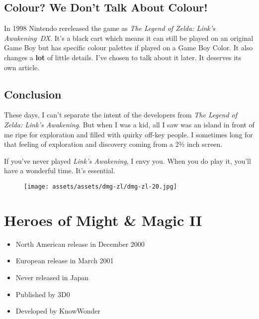\documentclass{book}
\begin{document}
\FloatBarrier\needspace{5pt}\section*{Colour? We Don’t Talk About Colour!}\nopagebreak[4]

In 1998 Nintendo rereleased the game as \emph{The Legend of Zelda: Link’s Awakening DX}. It’s a black cart which means it can still be played on an original Game Boy but has specific colour palettes if played on a Game Boy Color. It also changes a \textbf{lot} of little details. I’ve chosen to talk about it later. It deserves its own article.

\FloatBarrier\needspace{5pt}\section*{Conclusion}\nopagebreak[4]

These days, I can’t separate the intent of the developers from \emph{The Legend of Zelda: Link’s Awakening}. But when I was a kid, all I saw was an island in front of me ripe for exploration and filled with quirky off-key people. I sometimes long for that feeling of exploration and discovery coming from a 2½ inch screen.

If you’ve never played \emph{Link’s Awakening}, I envy you. When you do play it, you’ll have a wonderful time. It’s essential.

\begin{figure}[hbt]
\vskip 10pt
\centering \texttt{[image: assets/assets/dmg-zl/dmg-zl-20.jpg]}
\vskip 6pt
\end{figure}


\begingroup \chapter*{Heroes of Might \& Magic II} \endgroup

\begin{itemize} \setlength\itemsep{-0.4em}
\item North American release in December 2000
\item European release in March 2001
\item Never released in Japan
\item Published by 3D0
\item Developed by KnowWonder
\end{itemize}\noindent
\end{document}
